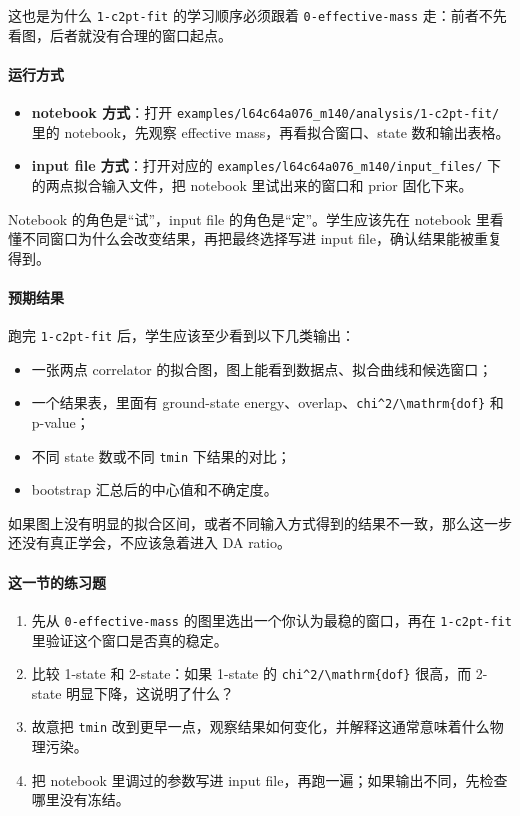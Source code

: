 \documentclass[11pt,a4paper,fontset=fandol]{ctexart}
\begin{document}
这也是为什么 \lstinline|1-c2pt-fit| 的学习顺序必须跟着 \lstinline|0-effective-mass| 走：前者不先看图，后者就没有合理的窗口起点。

\paragraph{运行方式}

\begin{itemize}[leftmargin=2em]
  \item \textbf{notebook 方式}：打开 \lstinline|examples/l64c64a076_m140/analysis/1-c2pt-fit/| 里的 notebook，先观察 effective mass，再看拟合窗口、state 数和输出表格。
  \item \textbf{input file 方式}：打开对应的 \lstinline|examples/l64c64a076_m140/input_files/| 下的两点拟合输入文件，把 notebook 里试出来的窗口和 prior 固化下来。
\end{itemize}

Notebook 的角色是“试”，input file 的角色是“定”。学生应该先在 notebook 里看懂不同窗口为什么会改变结果，再把最终选择写进 input file，确认结果能被重复得到。

\paragraph{预期结果}

跑完 \lstinline|1-c2pt-fit| 后，学生应该至少看到以下几类输出：

\begin{itemize}[leftmargin=2em]
  \item 一张两点 correlator 的拟合图，图上能看到数据点、拟合曲线和候选窗口；
  \item 一个结果表，里面有 ground-state energy、overlap、\lstinline|chi^2/\mathrm{dof}| 和 p-value；
  \item 不同 state 数或不同 \lstinline|tmin| 下结果的对比；
  \item bootstrap 汇总后的中心值和不确定度。
\end{itemize}

如果图上没有明显的拟合区间，或者不同输入方式得到的结果不一致，那么这一步还没有真正学会，不应该急着进入 DA ratio。

\paragraph{这一节的练习题}

\begin{enumerate}[leftmargin=2em]
  \item 先从 \lstinline|0-effective-mass| 的图里选出一个你认为最稳的窗口，再在 \lstinline|1-c2pt-fit| 里验证这个窗口是否真的稳定。
  \item 比较 1-state 和 2-state：如果 1-state 的 \lstinline|chi^2/\mathrm{dof}| 很高，而 2-state 明显下降，这说明了什么？
  \item 故意把 \lstinline|tmin| 改到更早一点，观察结果如何变化，并解释这通常意味着什么物理污染。
  \item 把 notebook 里调过的参数写进 input file，再跑一遍；如果输出不同，先检查哪里没有冻结。
\end{enumerate}
\end{document}
